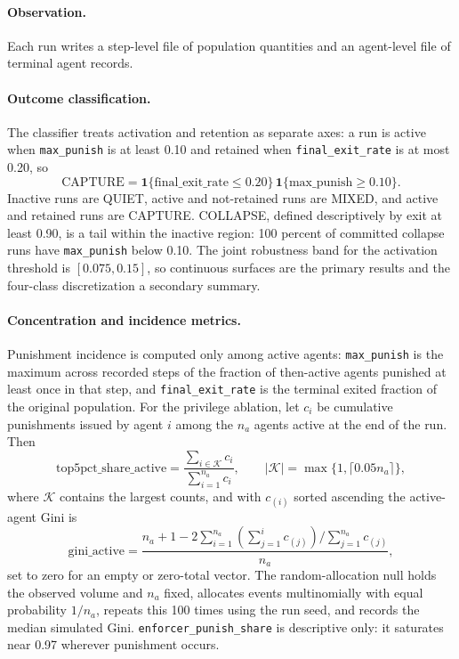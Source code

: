 \documentclass[12pt]{article}
\begin{document}
\paragraph{Observation.} Each run writes a step-level file of population
quantities and an agent-level file of terminal agent records.

\paragraph{Outcome classification.} The classifier treats activation and
retention as separate axes: a run is active when \texttt{max\_punish} is at
least 0.10 and retained when \texttt{final\_exit\_rate} is at most 0.20, so
\begin{equation}
 \mathrm{CAPTURE}=\mathbf{1}\{\mathrm{final\_exit\_rate}\leq0.20\}\,\mathbf{1}\{\mathrm{max\_punish}\geq0.10\}.
\end{equation}
Inactive runs are QUIET, active and not-retained runs are MIXED, and active and
retained runs are CAPTURE. COLLAPSE, defined descriptively by exit at least
0.90, is a tail within the inactive region: 100 percent of committed collapse
runs have \texttt{max\_punish} below 0.10. The joint robustness band for the
activation threshold is \([0.075,0.15]\), so continuous surfaces are the primary
results and the four-class discretization a secondary summary.

\paragraph{Concentration and incidence metrics.} Punishment incidence is
computed only among active agents: \texttt{max\_punish} is the maximum across
recorded steps of the fraction of then-active agents punished at least once in
that step, and \texttt{final\_exit\_rate} is the terminal exited fraction of the
original population. For the privilege ablation, let \(c_i\) be cumulative
punishments issued by agent \(i\) among the \(n_a\) agents active at the end of
the run. Then
\begin{equation}
 \mathrm{top5pct\_share\_active}=\frac{\sum_{i\in\mathcal{K}}c_i}{\sum_{i=1}^{n_a}c_i},\qquad |\mathcal{K}|=\max\{1,\lceil0.05n_a\rceil\},
\end{equation}
where \(\mathcal{K}\) contains the largest counts, and with \(c_{(i)}\) sorted
ascending the active-agent Gini is
\begin{equation}
 \mathrm{gini\_active}=\frac{n_a+1-2\sum_{i=1}^{n_a}\left(\sum_{j=1}^{i}c_{(j)}\right)/\sum_{j=1}^{n_a}c_{(j)}}{n_a},
\end{equation}
set to zero for an empty or zero-total vector. The random-allocation null holds
the observed volume and \(n_a\) fixed, allocates events multinomially with equal
probability \(1/n_a\), repeats this 100 times using the run seed, and records
the median simulated Gini. \texttt{enforcer\_punish\_share} is descriptive only:
it saturates near 0.97 wherever punishment occurs.
\end{document}
